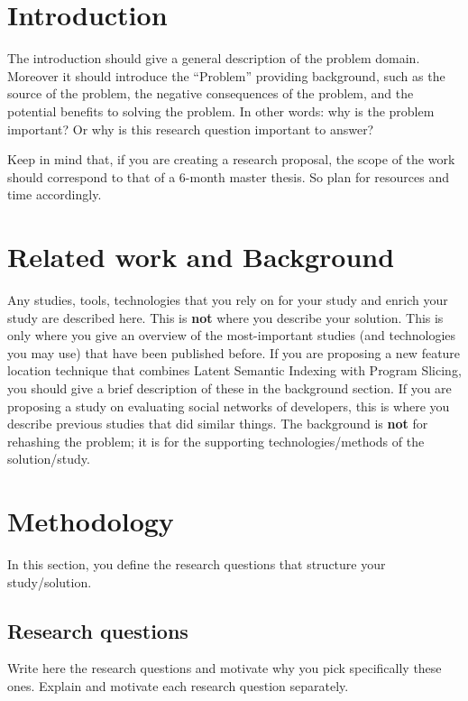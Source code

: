 \documentclass[sigconf,screen]{acmart}
\begin{document}
\section{Introduction}
The introduction should give a general description of the problem domain. Moreover it should introduce the ``Problem'' providing background, such as the source of the problem, the negative consequences of the problem, and the potential benefits to solving the problem. In other words: why is the problem important? Or why is this research question important to answer?

Keep in mind that, if you are creating a research proposal, the scope of the work should correspond to that of a 6-month master thesis. So plan for resources and time accordingly.

\section{Related work and Background}

Any studies, tools, technologies that you rely on for your study and enrich your study are described here. This is \textbf{not} where you describe your solution. This is only where you give an overview of the most-important studies (and technologies you may use) that have been published before. If you are proposing a new feature location technique that combines Latent Semantic Indexing with Program Slicing, you should give a brief description of these in the background section. If you are proposing a study on evaluating social networks of developers, this is where you describe previous studies that did similar things. The background is \textbf{not} for rehashing the problem; it is for the supporting technologies/methods of the solution/study.


\section{Methodology}

In this section, you define the research questions that structure your study/solution.

\subsection{Research questions}

Write here the research questions and motivate why you pick specifically these ones. Explain and motivate each research question separately.
\end{document}
